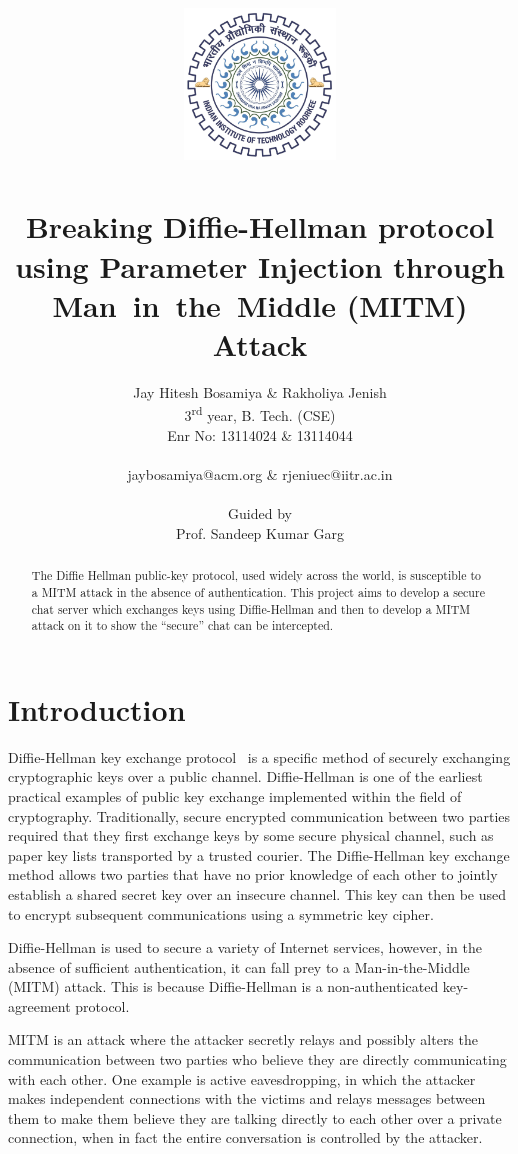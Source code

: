 \documentclass[12pt,a4paper]{article}
\title{
	\includegraphics[width=0.3\textwidth]{pictures/iitr-logo}\\~\\
	{\LARGE Breaking Diffie-Hellman protocol using Parameter Injection through Man~in~the~Middle (MITM) Attack}
}
\author{
	Jay Hitesh Bosamiya \& Rakholiya Jenish\\
	{\small 3\textsuperscript{rd} year, B. Tech. (CSE)}\\
	{\small Enr No: 13114024 \& 13114044}\\
	\\
	{\small jaybosamiya@acm.org \& rjeniuec@iitr.ac.in}\\
	\\
	Guided by\\
	Prof. Sandeep Kumar Garg
}
\date{}
\begin{document}
\maketitle

\vspace{1cm}
\begin{abstract}
	The Diffie Hellman public-key protocol, used widely across the world, is susceptible to a 
	MITM attack in the absence of authentication. This project aims to develop a secure chat server 
	which exchanges keys using Diffie-Hellman and then to develop a MITM attack on it to show  the 
	``secure'' chat can be intercepted.
\end{abstract}

\newpage

\tableofcontents

\newpage

\section{Introduction}
\label{sec:intro}

Diffie-Hellman key exchange protocol~\cite{Diffie76newdirections} is a specific method of securely exchanging cryptographic keys over a public channel. Diffie-Hellman is one of the earliest practical examples of public key exchange implemented within the field of cryptography. Traditionally, secure encrypted communication between two parties required that they first exchange keys by some secure physical channel, such as paper key lists transported by a trusted courier. The Diffie-Hellman key exchange method allows two parties that have no prior knowledge of each other to jointly establish a shared secret key over an insecure channel. This key can then be used to encrypt subsequent communications using a symmetric key cipher.

Diffie-Hellman is used to secure a variety of Internet services, however, in the absence of sufficient authentication, it can fall prey to a Man-in-the-Middle (MITM) attack. This is because Diffie-Hellman is a non-authenticated key-agreement protocol.

MITM is an attack where the attacker secretly relays and possibly alters the communication between two parties who believe they are directly communicating with each other. One example is active eavesdropping, in which the attacker makes independent connections with the victims and relays messages between them to make them believe they are talking directly to each other over a private connection, when in fact the entire conversation is controlled by the attacker.
\end{document}
